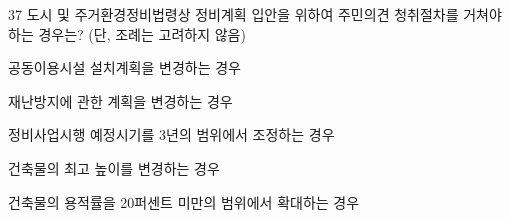 \begin{question}{37}
도시 및 주거환경정비법령상 정비계획 입안을 위하여 주민의견 청취절차를 거쳐야 하는 경우는? (단, 조례는 고려하지 않음)
\begin{choices}
  \item 공동이용시설 설치계획을 변경하는 경우
  \item 재난방지에 관한 계획을 변경하는 경우
  \item 정비사업시행 예정시기를 3년의 범위에서 조정하는 경우
  \item 건축물의 최고 높이를 변경하는 경우
  \item 건축물의 용적률을 20퍼센트 미만의 범위에서 확대하는 경우
\end{choices}
\end{question}
